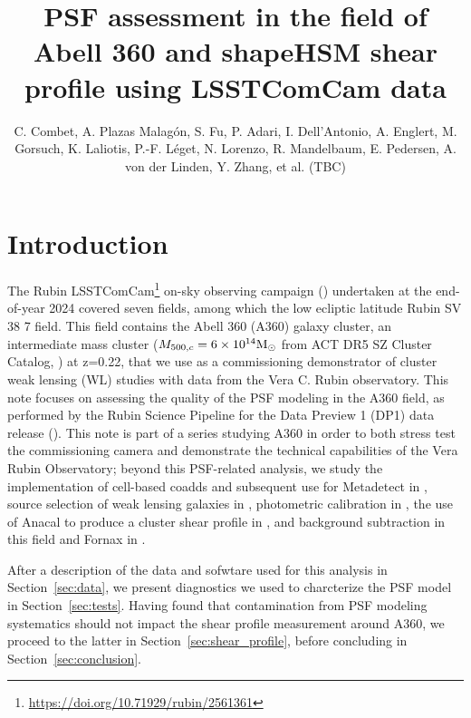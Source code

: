 \documentclass[SE,lsstdraft,authoryear,toc]{lsstdoc}
\title{PSF assessment in the field of Abell 360 and shapeHSM shear profile using LSSTComCam data}
\author{%
C. Combet, A. Plazas Malagón, S. Fu, P. Adari, I. Dell'Antonio, A. Englert, M. Gorsuch, K. Laliotis, P.-F. Léget, N. Lorenzo, R. Mandelbaum, E. Pedersen, A. von der Linden, Y. Zhang, et al. (TBC)
}
\date{\vcsDate}
\begin{document}
\maketitle

\section{Introduction}
The Rubin LSSTComCam\footnote{\url{https://doi.org/10.71929/rubin/2561361}} on-sky observing campaign ()
undertaken at the end-of-year 2024 covered seven fields, among which the low ecliptic latitude Rubin SV 38 7 field. This field contains the Abell 360 (A360) galaxy cluster, an intermediate mass cluster ($M_{500,c} = 6\times 10^{14} \rm{M}_\odot$ from ACT DR5 SZ Cluster Catalog, \citealp{2021ApJS..253....3H}) at z=0.22, that we use as a commissioning demonstrator of cluster weak lensing (WL) studies with data from the Vera C. Rubin observatory. This note focuses on assessing the quality of the PSF modeling in the A360 field, as performed by the Rubin Science Pipeline for the Data Preview 1 (DP1) data release (). This note is part of a series studying A360 in order to both stress test the commissioning camera and demonstrate the technical capabilities of the Vera Rubin Observatory; beyond this PSF-related analysis, we study the implementation of cell-based coadds and subsequent use for Metadetect in , source selection of weak lensing galaxies in , photometric calibration in \cite{}, the use of Anacal to produce a cluster shear profile in , and background subtraction in this field and Fornax in \cite{}.




After a description of the data and sofwtare used for this analysis in Section~\ref{sec:data}, we present diagnostics we used to charcterize the PSF model in Section~\ref{sec:tests}. Having found that contamination from PSF modeling systematics should not impact the shear profile measurement around A360, we proceed to the latter in Section~\ref{sec:shear_profile}, before concluding in Section~\ref{sec:conclusion}.
\end{document}
